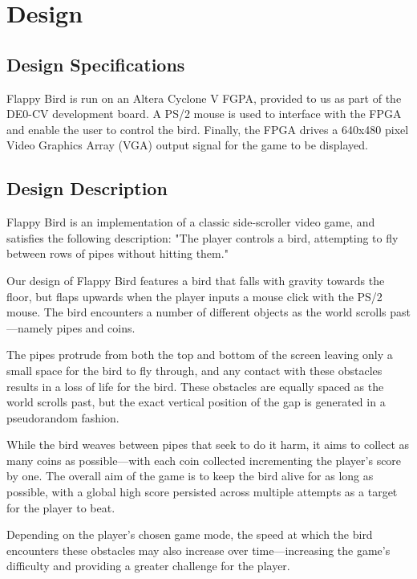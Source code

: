 \documentclass[conference]{IEEEtran}
\begin{document}
\section{Design}

\subsection{Design Specifications}

Flappy Bird is run on an Altera Cyclone V FGPA, provided to us as part of the DE0-CV development board. A PS/2 mouse is used to interface with the FPGA and enable the user to control the bird. Finally, the FPGA drives a 640x480 pixel Video Graphics Array (VGA) output signal for the game to be displayed.

\subsection{Design Description}

Flappy Bird is an implementation of a classic side-scroller video game, and satisfies the following description: "The player controls a bird, attempting to fly between rows of pipes without hitting them."

Our design of Flappy Bird features a bird that falls with gravity towards the floor, but flaps upwards when the player inputs a mouse click with the PS/2 mouse. The bird encounters a number of different objects as the world scrolls past—namely pipes and coins.

The pipes protrude from both the top and bottom of the screen leaving only a small space for the bird to fly through, and any contact with these obstacles results in a loss of life for the bird. These obstacles are equally spaced as the world scrolls past, but the exact vertical position of the gap is generated in a pseudorandom fashion.

While the bird weaves between pipes that seek to do it harm, it aims to collect as many coins as possible—with each coin collected incrementing the player's score by one. The overall aim of the game is to keep the bird alive for as long as possible, with a global high score persisted across multiple attempts as a target for the player to beat.

Depending on the player's chosen game mode, the speed at which the bird encounters these obstacles may also increase over time—increasing the game's difficulty and providing a greater challenge for the player.
\end{document}
